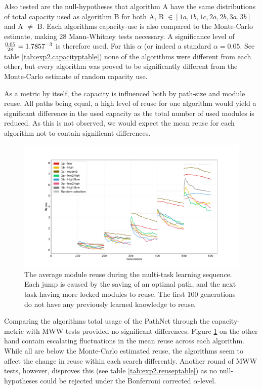 Also tested are the null-hypotheses that algorithm A have the same distributions of total capacity used as algorithm B for both A, B \(\in [1a, 1b, 1c, 2a, 2b, 3a, 3b]\) and A \(\neq\) B. Each algorithms capacity-use is also compared to the Monte-Carlo estimate, making 28 Mann-Whitney tests necessary. A significance level of \(\frac{0.05}{28}=1.7857\time 10^{-3}\) is therefore used. For this \(\alpha\) (or indeed a standard \(\alpha=0.05\). See table \ref{tab:exp2.capacityptable}) none of the algorithms were different from each other, but every algorithm was proved to be significantly different from the Monte-Carlo estimate of random capacity use. 

As a metric by itself, the capacity is influenced both by path-size and module reuse. All paths being equal, a high level of reuse for one algorithm would yield a significant difference in the used capacity as the total number of used modules is reduced. As this is not observed, we would expect the mean reuse for each algorithm not to contain significant differences.

\begin{figure}
    \includegraphics[width=1.2\textwidth,center]{Chapters/4.Experiments/exp2/figures/inuse/Module_reuse_pr_generation.pdf}
    \caption[Module reuse plot]{The average module reuse during the multi-task learning sequence. Each jump is caused by the saving of an optimal path, and the next task having more locked modules to reuse. The first 100 generations do not have any previously learned knowledge to reuse.}
    \label{fig:search.reuse}
\end{figure}

Comparing the algorithms total usage of the PathNet through the capacity-metric with MWW-tests provided no significant differences. Figure \ref{fig:search.reuse} on the other hand contain escalating fluctuations in the mean reuse across each algorithm. While all are below the Monte-Carlo estimated reuse, the algorithms seem to affect the change in reuse within each search differently. Another round of MWW tests, however, disproves this (see table \ref{tab:exp2.reuseptable}) as no null-hypotheses could be rejected under the Bonferroni corrected \(\alpha\)-level.

